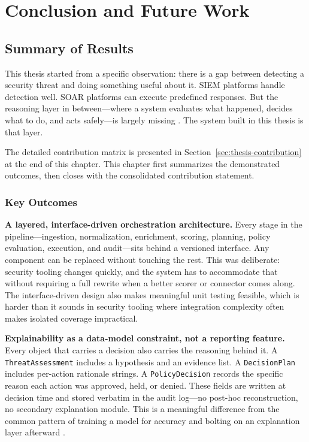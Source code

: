 
\chapter{Conclusion and Future Work}

\label{chap:conclusion}


\section{Summary of Results}

This thesis started from a specific observation: there is a gap between detecting a security threat and doing something useful about it. SIEM platforms handle detection well. SOAR platforms can execute predefined responses. But the reasoning layer in between---where a system evaluates what happened, decides what to do, and acts safely---is largely missing \cite{nist80092, nist80061, tilbury2024humans}. The system built in this thesis is that layer.

The detailed contribution matrix is presented in Section~\ref{sec:thesis-contribution} at the end of this chapter. This chapter first summarizes the demonstrated outcomes, then closes with the consolidated contribution statement.

\subsection{Key Outcomes}

\textbf{A layered, interface-driven orchestration architecture.}
Every stage in the pipeline---ingestion, normalization, enrichment, scoring, planning, policy evaluation, execution, and audit---sits behind a versioned interface. Any component can be replaced without touching the rest. This was deliberate: security tooling changes quickly, and the system has to accommodate that without requiring a full rewrite when a better scorer or connector comes along. The interface-driven design also makes meaningful unit testing feasible, which is harder than it sounds in security tooling where integration complexity often makes isolated coverage impractical.

\textbf{Explainability as a data-model constraint, not a reporting feature.}
Every object that carries a decision also carries the reasoning behind it. A \texttt{ThreatAssessment} includes a hypothesis and an evidence list. A \texttt{DecisionPlan} includes per-action rationale strings. A \texttt{PolicyDecision} records the specific reason each action was approved, held, or denied. These fields are written at decision time and stored verbatim in the audit log---no post-hoc reconstruction, no secondary explanation module. This is a meaningful difference from the common pattern of training a model for accuracy and bolting on an explanation layer afterward \cite{sommer2010outside, tilbury2024humans}.

